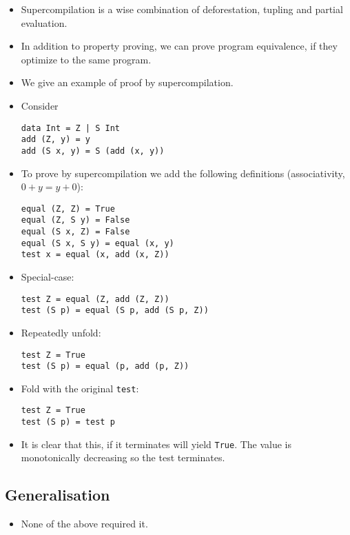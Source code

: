 \begin{itemize}

\item Supercompilation is a wise combination of deforestation, tupling and
partial evaluation.

\item In addition to property proving, we can prove program equivalence, if
they optimize to the same program.

\item We give an example of proof by supercompilation.

\item Consider 

\begin{verbatim}
data Int = Z | S Int
add (Z, y) = y
add (S x, y) = S (add (x, y))
\end{verbatim}

\item To prove by supercompilation we add the following definitions
(associativity, $0+y=y+0$):

\begin{verbatim}
equal (Z, Z) = True
equal (Z, S y) = False
equal (S x, Z) = False
equal (S x, S y) = equal (x, y)
test x = equal (x, add (x, Z))
\end{verbatim}

\item Special-case:

\begin{verbatim}
test Z = equal (Z, add (Z, Z))
test (S p) = equal (S p, add (S p, Z))
\end{verbatim}

\item Repeatedly unfold:

\begin{verbatim}
test Z = True
test (S p) = equal (p, add (p, Z))
\end{verbatim}

\item Fold with the original \texttt{test}:

\begin{verbatim}
test Z = True
test (S p) = test p
\end{verbatim}

\item It is clear that this, if it terminates will yield \texttt{True}. The
value is monotonically decreasing so the test terminates.

\end{itemize}

\subsection{Generalisation}

\begin{itemize}

\item None of the above required it.

\end{itemize}
